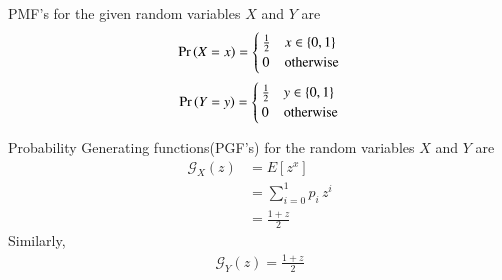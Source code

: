 \documentclass[journal,12pt,twocolumn]{IEEEtran}
\begin{document}
\begin{definition}
PMF's for the given random variables $X$ and $Y$ are
 \begin{equation}
         \Pr\left(X=x\right) = 
     \begin{cases}
      \frac{1}{2} & x \in \left\{0,1\right\}\\
      0 & \text{otherwise}
     \end{cases}
 \end{equation}
  \begin{equation}
         \Pr\left(Y=y\right) = 
     \begin{cases}
      \frac{1}{2} & y \in \left\{0,1\right\}\\
      0 & \text{otherwise}
     \end{cases}
 \end{equation}
\end{definition}

\begin{definition}
Probability Generating functions(PGF's) for the random variables $X$ and $Y$ are
\begin{align}
    \mathcal{G}_{X}(z) &= E[z^x]\\
                       &= \sum_{i=0}^{1}p_i\,z^i\\
                       &=\frac{1+z}{2}
\end{align}
Similarly,
\begin{align}
    \mathcal{G}_{Y}(z) = \frac{1+z}{2}
\end{align}
\end{definition}
\end{document}
